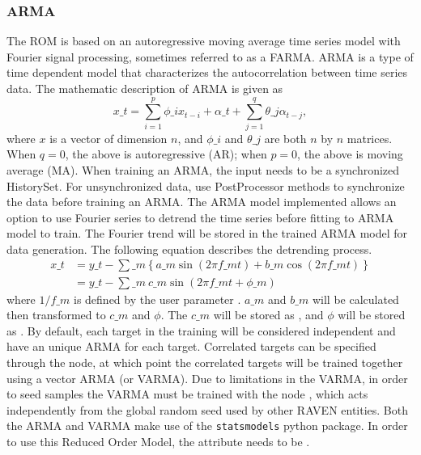 \subsubsection{ARMA}
  The  ROM is based on an autoregressive moving average time series model with
  Fourier signal processing, sometimes referred to as a FARMA.                         ARMA is a
  type of time dependent model that characterizes the autocorrelation between time series data. The
  mathematic description of ARMA is given as                         \begin{equation*}
  x\_t = \sum_{i=1}^p\phi\_ix_{t-i}+\alpha\_t+\sum_{j=1}^q\theta\_j\alpha_{t-j},
  \end{equation*}                         where $x$ is a vector of dimension $n$, and $\phi\_i$ and
  $\theta\_j$ are both $n$ by $n$ matrices. When $q=0$, the above is
  autoregressive (AR); when $p=0$, the above is moving average (MA).                         When
  training an ARMA, the input needs to be a synchronized HistorySet. For unsynchronized data, use
  PostProcessor methods to                         synchronize the data before training an ARMA.
  The ARMA model implemented allows an option to use Fourier series to detrend the time series
  before fitting to ARMA model to                         train. The Fourier trend will be stored in
  the trained ARMA model for data generation. The following equation
  describes the detrending                         process.
  \begin{equation*}                         \begin{aligned}                         x\_t &= y\_t -
  \sum\_m\left\{a\_m\sin(2\pi f\_mt)+b\_m\cos(2\pi f\_mt)\right\}  \\                         &=y\_t -
  \sum\_m\ c\_m\sin(2\pi f\_mt+\phi\_m)                         \end{aligned}
  \end{equation*}                         where $1/f\_m$ is defined by the user parameter
  . \nb $a\_m$ and $b\_m$ will be calculated then transformed to
  $c\_m$ and $\phi$. The $c\_m$ will be stored as , and $\phi$ will be stored as
  .                         By default, each target in the training will be
  considered independent and have an unique ARMA for each                         target.
  Correlated targets can be specified through the  node, at which point
  the correlated targets will be trained together using a vector ARMA (or VARMA). Due to limitations
  in                         the VARMA, in order to seed samples the VARMA must be trained with the
  node , which acts                         independently from the global random seed
  used by other RAVEN entities.                         Both the ARMA and VARMA make use of the
  \texttt{statsmodels} python package.                         In order to use this Reduced Order
  Model, the  attribute                          needs to be
  .

